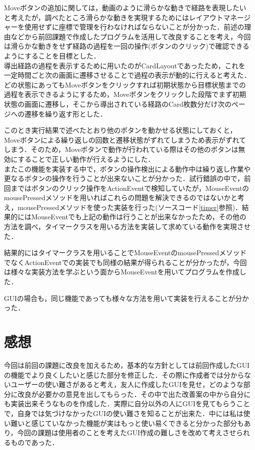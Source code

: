 \documentclass[12pt]{jarticle}
\begin{document}
\vspace{10mm}

Moveボタンの追加に関しては，動画のように滑らかな動きで経路を表現したいと考えたが，調べたところ滑らかな動きを実現するためにはレイアウトマネージャーを使用せずに座標で管理を行わなければならないことが分かった．前述の理由などから前回課題で作成したプログラムを活用して改良することを考え，今回は滑らかな動きをせず経路の過程を一回の操作(ボタンのクリック)で確認できるようにすることを目標とした．\\

導出経路の過程を表示するために用いたのがCardLayoutであったため，これを一定時間ごと次の画面に遷移させることで過程の表示が動的に行えると考えた．どの状態にあってもMoveボタンをクリックすれば初期状態から目標状態までの過程を表示できるようにするため，Moveボタンをクリックした段階でまず初期状態の画面に遷移し，そこから導出されている経路のCard枚数分だけ次のページへの遷移を繰り返す形とした．\par
このとき実行結果で述べたとおり他のボタンを動かせる状態にしておくと，Moveボタンによる繰り返しの回数と遷移状態がずれてしまうため表示がずれてしまう．そのため，Moveボタンで動作が行われている際はその他のボタンは無効にすることで正しい動作が行えるようにした．\\


またこの機能を実装する中で，ボタンの操作検出による動作中は繰り返し作業や更なるボタンの操作を行うことが出来ないことが分かった．試行錯誤の中で，前回まではボタンのクリック操作をActionEventで検知していたが，MouseEventのmousePressedメソッドを用いればこれらの問題を解決できるのではないかと考え，mousePressedメソッドを使った実装を行った(ソースコード\ref{timer}参照)．結果的にはMouseEventでも上記の動作は行うことが出来なかったため，その他の方法を調べ，タイマークラスを用いる方法を実装して求めている動作を実現させた．\par
結果的にはタイマークラスを用いることでMouseEventのmousePressedメソッドでなくActionEventでの実装でも同様の結果が得られることが分かったが，今回は様々な実装方法を学ぶという面からMouseEventを用いてプログラムを作成した．\par
GUIの場合も，同じ機能であっても様々な方法を用いて実装を行えることが分かった．

\section{感想}
今回は前回の課題に改良を加えるため，基本的な方針としては前回作成したGUIの機能でより良くしたいと感じた部分を修正した．その際に作成者では分からないユーザーの使い難さがあると考え，友人に作成したGUIを見せ，どのような部分に改良が必要かの意見を出してもらった．その中で出た改善案の中から自分にも実装出来そうなものを作成した．実際に自分以外の人にGUIを見てもらうことで，自身では気づけなかったGUIの使い難さを知ることが出来た．中には私は使い難いと感じていなかった機能が実はもっと使い易くできると分かった部分もあり，今回の課題は使用者のことを考えたGUI作成の難しさを改めて考えさせられるものであった．\\
\end{document}
